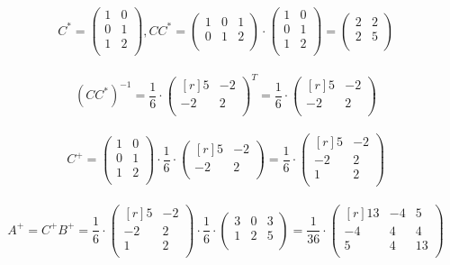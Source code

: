 \documentclass[12pt]{article}
\begin{document}
	\[C^* = \begin{pmatrix}
	1 & 0 \\         
	0 & 1 \\
	1 & 2 \\
	\end{pmatrix}, CC^* = \begin{pmatrix}
	1 & 0 & 1 \\         
	0 & 1 & 2 \\
	\end{pmatrix} \cdot \begin{pmatrix}
	1 & 0 \\         
	0 & 1 \\
	1 & 2 \\
	\end{pmatrix} = \begin{pmatrix}
	2 & 2 \\         
	2 & 5 \\
	\end{pmatrix}\]\\
	\[(CC^*)^{-1} = \frac{1}{6} \cdot \begin{pmatrix}[r]
	5 & -2 \\         
	-2 & 2 \\
	\end{pmatrix}^T = \frac{1}{6} \cdot \begin{pmatrix}[r]
	5 & -2 \\         
	-2 & 2 \\
	\end{pmatrix}\]\\
	\[C^+ = \begin{pmatrix}
	1 & 0 \\         
	0 & 1 \\
	1 & 2 \\
	\end{pmatrix} \cdot \frac{1}{6} \cdot \begin{pmatrix}[r]
	5 & -2 \\         
	-2 & 2 \\
	\end{pmatrix} = \frac{1}{6} \cdot \begin{pmatrix}[r]
	5 & -2 \\         
	-2 & 2 \\
	1 & 2 \\
	\end{pmatrix}\]\\
	\[A^+ = C^+B^+ = \frac{1}{6} \cdot \begin{pmatrix}[r]
	5 & -2 \\         
	-2 & 2 \\
	1 & 2 \\
	\end{pmatrix} \cdot \frac{1}{6} \cdot \begin{pmatrix}
	3 & 0 & 3 \\         
	1 & 2 & 5 \\
	\end{pmatrix} = \frac{1}{36} \cdot \begin{pmatrix}[r]
	13 & -4 & 5 \\         
	-4 & 4 & 4 \\
	5 & 4 & 13 \\
	\end{pmatrix}\]
\end{document}
